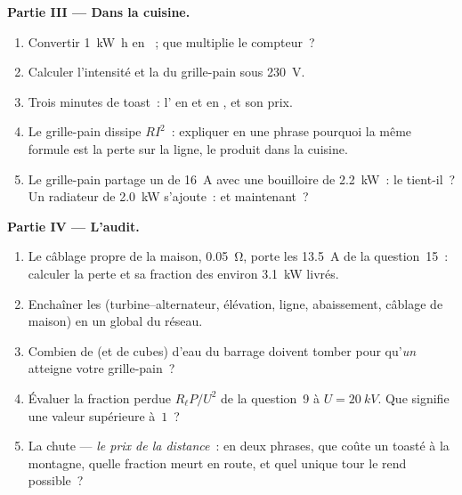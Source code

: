 \begin{problem}
\medskip
\noindent\textbf{Partie III --- Dans la cuisine.}
\begin{enumerate}[resume]
  \item Convertir \qty{1}{kW.h} en
        ~; que multiplie le compteur~?
  \item Calculer l'intensité et la
         du grille-pain sous
        \qty{230}{V}.
  \item Trois minutes de toast~:
        l' en
         et en
        , et son prix.
  \item Le grille-pain dissipe $RI^2$~: expliquer en une phrase pourquoi
        la même formule est la perte sur la ligne, le produit dans la
        cuisine.
  \item Le grille-pain partage un
         de \qty{16}{A} avec une
        bouilloire de \qty{2.2}{kW}~: le
         tient-il~? Un radiateur de
        \qty{2.0}{kW} s'ajoute~: et maintenant~?
\end{enumerate}

\medskip
\noindent\textbf{Partie IV --- L'audit.}
\begin{enumerate}[resume]
  \item Le câblage propre de la maison,
         \qty{0.05}{\ohm}, porte
        les \qty{13.5}{A} de la question~15~: calculer la perte et sa
        fraction des environ \qty{3.1}{kW} livrés.
  \item Enchaîner les  (turbine--alternateur, élévation, ligne,
        abaissement, câblage de maison) en un
         global du réseau.
  \item Combien de  (et de 
        cubes) d'eau du barrage doivent tomber pour qu'\emph{un}
         atteigne votre
        grille-pain~?
  \item Évaluer la fraction perdue $R_\ell P/U^2$ de la question~9 à
        $U = \qty{20}{kV}$. Que signifie une valeur supérieure à~$1$~?
  \item La chute --- \emph{le prix de la distance}~: en deux phrases,
        que coûte un  toasté à la
        montagne, quelle fraction meurt en route, et quel unique tour
        le rend possible~?
\end{enumerate}
\end{problem}
